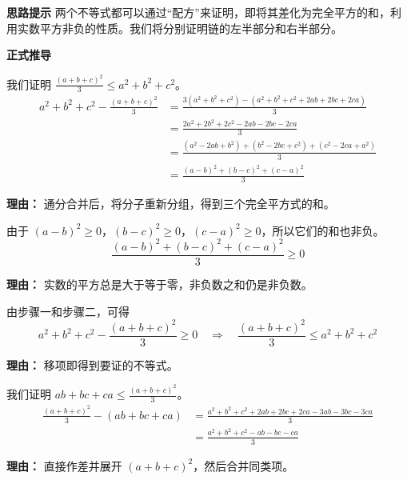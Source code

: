 \begin{proofbox}
\textbf{\textcolor{CProof}{思路提示}}
两个不等式都可以通过“配方”来证明，即将其差化为完全平方的和，利用实数平方非负的性质。我们将分别证明链的左半部分和右半部分。

\medskip
\textbf{\textcolor{CProof}{正式推导}}
\begin{description}[style=nextline, leftmargin=2.8em, labelsep=0.5em, itemsep=0.55em]
    \item[\textbf{步骤一（证明右半部分）：}] 我们证明 $\frac{(a+b+c)^2}{3} \leq a^2 + b^2 + c^2$。
    \[
    \begin{aligned}
    a^2 + b^2 + c^2 - \frac{(a+b+c)^2}{3}
    &= \frac{3(a^2+b^2+c^2) - (a^2+b^2+c^2+2ab+2bc+2ca)}{3} \\
    &= \frac{2a^2+2b^2+2c^2 - 2ab - 2bc - 2ca}{3} \\
    &= \frac{(a^2-2ab+b^2) + (b^2-2bc+c^2) + (c^2-2ca+a^2)}{3} \\
    &= \frac{(a-b)^2 + (b-c)^2 + (c-a)^2}{3}
    \end{aligned}
    \]
    \par\textbf{理由：}
    通分合并后，将分子重新分组，得到三个完全平方式的和。

    \item[\textbf{步骤二（判断右半符号）：}] 由于 $(a-b)^2 \ge 0$，$(b-c)^2 \ge 0$，$(c-a)^2 \ge 0$，所以它们的和也非负。
    \[
    \frac{(a-b)^2 + (b-c)^2 + (c-a)^2}{3} \ge 0
    \]
    \par\textbf{理由：}
    实数的平方总是大于等于零，非负数之和仍是非负数。

    \item[\textbf{步骤三（得出右不等式）：}] 由步骤一和步骤二，可得
    \[
    a^2 + b^2 + c^2 - \frac{(a+b+c)^2}{3} \ge 0 \quad \Rightarrow \quad \frac{(a+b+c)^2}{3} \leq a^2 + b^2 + c^2
    \]
    \par\textbf{理由：}
    移项即得到要证的不等式。

    \item[\textbf{步骤四（证明左半部分）：}] 我们证明 $ab + bc + ca \leq \frac{(a+b+c)^2}{3}$。
    \[
    \begin{aligned}
    \frac{(a+b+c)^2}{3} - (ab + bc + ca)
    &= \frac{a^2+b^2+c^2+2ab+2bc+2ca - 3ab - 3bc - 3ca}{3} \\
    &= \frac{a^2+b^2+c^2 - ab - bc - ca}{3}
    \end{aligned}
    \]
    \par\textbf{理由：}
    直接作差并展开 $(a+b+c)^2$，然后合并同类项。


\end{description}
\end{proofbox}
